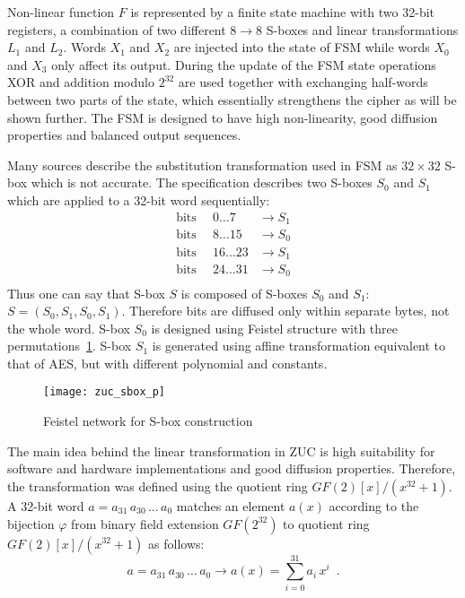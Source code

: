 Non-linear function $F$ is represented by a finite state machine with two 32-bit
registers, a combination of two different $8 \rightarrow 8$ S-boxes and linear
transformations $L_1$ and $L_2$. Words $X_1$ and $X_2$ are injected into the
state of FSM while words $X_0$ and $X_3$ only
affect its output. During the update of the FSM state operations XOR and
addition modulo $2^{32}$ are used together with exchanging half-words between two parts
of the state, which essentially strengthens the cipher as will be shown
further. The FSM is designed to have high non-linearity, good diffusion
properties and balanced output sequences. 

Many sources describe the substitution transformation used in FSM as 
$32 \times 32$ S-box which is not accurate. The specification describes two
S-boxes $S_0$ and $S_1$ which are applied to a 32-bit word sequentially:
\begin{equation}
	\begin{array}{lcl}
        \text{bits} & \enspace 0 \hdots 7 & \rightarrow S_1 \\
        \text{bits} & \enspace 8 \hdots 15 & \rightarrow S_0 \\
        \text{bits} & \enspace 16 \hdots 23 & \rightarrow S_1 \\
        \text{bits} & \enspace 24 \hdots 31 & \rightarrow S_0 \\
	\end{array}
\end{equation}
Thus one can say that S-box $S$ is composed of S-boxes $S_0$ and $S_1$: 
\mbox{$S = (S_0, S_1, S_0, S_1)$}. Therefore bits are
diffused only within separate bytes, not the whole word. S-box $S_0$ is designed
using Feistel structure with three permutations~\ref{fig:zuc-sbox-p}. S-box
$S_1$ is generated using affine transformation equivalent to that of AES, but with different
polynomial and constants.
\begin{figure}[htbp]
	\centering
	\texttt{[image: zuc\_sbox\_p]}
	\caption{Feistel network for S-box construction}
	\label{fig:zuc-sbox-p}
\end{figure}

The main idea behind the linear transformation in ZUC is high suitability for
software and hardware implementations and good diffusion properties. Therefore,
the transformation was defined using the quotient ring $GF(2)[x]/(x^{32}+1)$. A 32-bit word 
$a = a_{31} \, a_{30} \, \hdots \, a_0$ matches
an element $a(x)$ according to the bijection $\varphi$ from binary field
extension $GF(2^{32})$ to quotient ring $GF(2)[x]/(x^{32}+1)$ as follows:
\begin{equation}
\label{eqn:zuc-word-repr}
a =  a_{31} \, a_{30} \, \hdots \, a_0 \rightarrow a(x) =
\sum\limits_{i=0}^{31} a_i \, x^i \enspace.
\end{equation}

